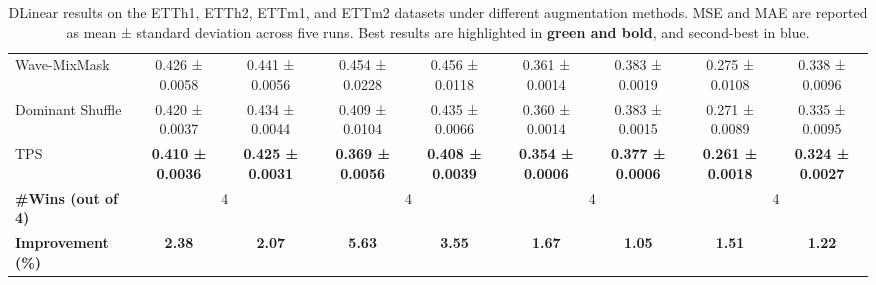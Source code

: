 \begin{table}[h!]
\begin{adjustbox}{max width=\textwidth}
\begin{tabular}{l|cc|cc|cc|cc}
        Wave-MixMask & 0.426 ± 0.0058 & 0.441 ± 0.0056 & 0.454 ± 0.0228 & 0.456 ± 0.0118 & 0.361 ± 0.0014 & 0.383 ± 0.0019 & 0.275 ± 0.0108 & 0.338 ± 0.0096 \\
        Dominant Shuffle  & \cellcolor{secondcolor}0.420 ± 0.0037 & \cellcolor{secondcolor}0.434 ± 0.0044 & 0.409 ± 0.0104 & 0.435 ± 0.0066 & 0.360 ± 0.0014 & 0.383 ± 0.0015 & 0.271 ± 0.0089 & 0.335 ± 0.0095  \\
    TPS          & \cellcolor{bestcolor}\textbf{0.410 ± 0.0036} & \cellcolor{bestcolor}\textbf{0.425 ± 0.0031} & \cellcolor{bestcolor}\textbf{0.369 ± 0.0056} & \cellcolor{bestcolor}\textbf{0.408 ± 0.0039} & \cellcolor{bestcolor}\textbf{0.354 ± 0.0006} & \cellcolor{bestcolor}\textbf{0.377 ± 0.0006} & \cellcolor{bestcolor}\textbf{0.261 ± 0.0018} & \cellcolor{bestcolor}\textbf{0.324 ± 0.0027} \\
    \midrule
    \textbf{\#Wins (out of 4)} & \multicolumn{2}{c|}{4} & \multicolumn{2}{c|}{4} & \multicolumn{2}{c|}{4} & \multicolumn{2}{c}{4} \\
    \textbf{Improvement (\%)} & \cellcolor{bestcolor} \textbf{2.38} & \cellcolor{bestcolor} \textbf{2.07} & \cellcolor{bestcolor} \textbf{5.63} & \cellcolor{bestcolor} \textbf{3.55} & \cellcolor{bestcolor} \textbf{1.67} & \cellcolor{bestcolor} \textbf{1.05} & \cellcolor{bestcolor} \textbf{1.51} & \cellcolor{bestcolor} \textbf{1.22} \\
    \bottomrule
\end{tabular}
\end{adjustbox}
\caption{DLinear results on the ETTh1, ETTh2, ETTm1, and ETTm2 datasets under different augmentation methods. MSE and MAE are reported as mean ± standard deviation across five runs. Best results are highlighted in \textbf{green and bold}, and second-best in blue.}
\label{tb: dl1}
\end{table}



